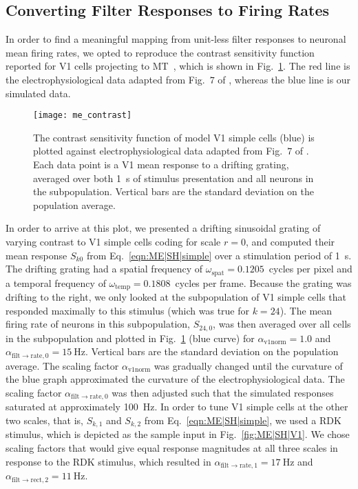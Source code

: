 \subsection{Converting Filter Responses to Firing Rates}
\label{sec:ME|V1|filter2mfr}

In order to find a meaningful mapping from unit-less
filter responses to neuronal mean firing rates,
we opted to reproduce the contrast sensitivity
function reported for V1 cells projecting to MT~\citep{MovshonNewsome1996}, 
which is shown in Fig.~\ref{fig:ME|SH|contrast}. 
The red line is the electrophysiological data adapted from 
Fig.~$7$ of \cite{MovshonNewsome1996},
whereas the blue line is our simulated
data.

\begin{figure}[t]
  \centering
  \texttt{[image: me\_contrast]}
  \caption{
  The contrast sensitivity function of model V1 simple cells
  (blue) is plotted against electrophysiological data adapted
  from Fig.~$7$ of \cite{MovshonNewsome1996}.
  Each data point is a V1 mean response to a drifting grating,
  averaged over both \SI{1}{\second} of stimulus presentation
  and all neurons in the subpopulation.
  Vertical bars are the standard deviation on the population
  average.}
  \label{fig:ME|SH|contrast}
\end{figure}

In order to arrive at this plot, we presented a drifting
sinusoidal grating of varying contrast to V1 simple cells
coding for scale $r=0$, and computed their mean response $S_{k0}$
from Eq.~\ref{eqn:ME|SH|simple}
over a stimulation period of \SI{1}{\second}.
The drifting grating
had a spatial frequency of 
$\omega_{\textrm{spat}} = 0.1205$~cycles per pixel
and a temporal frequency of 
$\omega_{\textrm{temp}} = 0.1808$~cycles per frame.
Because the grating was drifting to the
right, we only looked at the subpopulation of V1 simple cells
that responded maximally to this stimulus (which was true for
$k=24$). The mean firing rate of neurons in this subpopulation,
$S_{24,0}$, was then averaged over all cells in the subpopulation and
plotted in Fig.~\ref{fig:ME|SH|contrast} (blue curve) for 
$\alpha_{\textrm{v1norm}} = 1.0$ and 
$\alpha_{\textrm{filt} \rightarrow \textrm{rate},0} = \SI{15}{\hertz}$.
Vertical bars are the standard deviation on the population
average. The scaling factor $\alpha_{\textrm{v1norm}}$ was gradually
changed until the curvature of the blue graph approximated
the curvature of the electrophysiological data. The scaling
factor $\alpha_{\textrm{filt} \rightarrow \textrm{rate},0}$
was then adjusted such that the simulated
responses saturated at approximately \SI{100}{\hertz}.
In order to tune \ac{V1} simple cells at the other two scales, that
is, $S_{k,1}$ and $S_{k,2}$ from Eq.~\ref{eqn:ME|SH|simple},
we used a RDK stimulus, which is
depicted as the sample input in Fig.~\ref{fig:ME|SH|V1}.
We chose scaling factors that would give equal response magnitudes
at all three scales in response to the RDK stimulus, 
which resulted in 
$\alpha_{\textrm{filt} \rightarrow \textrm{rate},1} = \SI{17}{\hertz}$
and 
$\alpha_{\textrm{filt} \rightarrow \textrm{rect},2} = \SI{11}{\hertz}$.


